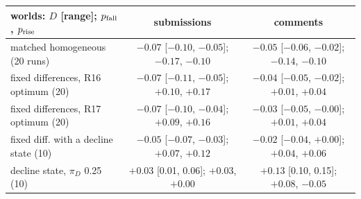 \documentclass[10pt]{article}
\begin{document}
\begin{center}\small\begin{tabular}{lcc}
\toprule
worlds: $D$ [range]; $p_{\rm fall}$, $p_{\rm rise}$ & submissions & comments\\
\midrule
matched homogeneous (20 runs) & $-0.07$ [$-0.10$, $-0.05$]; $-0.17$, $-0.10$ & $-0.05$ [$-0.06$, $-0.02$]; $-0.14$, $-0.10$\\
fixed differences, R16 optimum (20) & $-0.07$ [$-0.11$, $-0.05$]; $+0.10$, $+0.17$ & $-0.04$ [$-0.05$, $-0.02$]; $+0.01$, $+0.04$\\
fixed differences, R17 optimum (20) & $-0.07$ [$-0.10$, $-0.04$]; $+0.09$, $+0.16$ & $-0.03$ [$-0.05$, $-0.00$]; $+0.01$, $+0.04$\\
fixed diff. with a decline state (10) & $-0.05$ [$-0.07$, $-0.03$]; $+0.07$, $+0.12$ & $-0.02$ [$-0.04$, $+0.00$]; $+0.04$, $+0.06$\\
decline state, $\pi_D$ 0.25 (10) & $+0.03$ [0.01, 0.06]; $+0.03$, $+0.00$ & $+0.13$ [0.10, 0.15]; $+0.08$, $-0.05$\\
\bottomrule
\end{tabular}\end{center}
\end{document}
